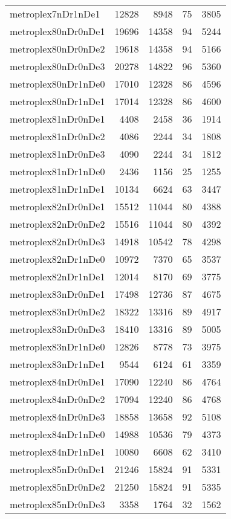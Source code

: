 \begin{longtable}{lrrrr}
metroplex7nDr1nDe1 & 12828 & 8948 & 75 & 3805 \\
metroplex80nDr0nDe1 & 19696 & 14358 & 94 & 5244 \\
metroplex80nDr0nDe2 & 19618 & 14358 & 94 & 5166 \\
metroplex80nDr0nDe3 & 20278 & 14822 & 96 & 5360 \\
metroplex80nDr1nDe0 & 17010 & 12328 & 86 & 4596 \\
metroplex80nDr1nDe1 & 17014 & 12328 & 86 & 4600 \\
metroplex81nDr0nDe1 & 4408 & 2458 & 36 & 1914 \\
metroplex81nDr0nDe2 & 4086 & 2244 & 34 & 1808 \\
metroplex81nDr0nDe3 & 4090 & 2244 & 34 & 1812 \\
metroplex81nDr1nDe0 & 2436 & 1156 & 25 & 1255 \\
metroplex81nDr1nDe1 & 10134 & 6624 & 63 & 3447 \\
metroplex82nDr0nDe1 & 15512 & 11044 & 80 & 4388 \\
metroplex82nDr0nDe2 & 15516 & 11044 & 80 & 4392 \\
metroplex82nDr0nDe3 & 14918 & 10542 & 78 & 4298 \\
metroplex82nDr1nDe0 & 10972 & 7370 & 65 & 3537 \\
metroplex82nDr1nDe1 & 12014 & 8170 & 69 & 3775 \\
metroplex83nDr0nDe1 & 17498 & 12736 & 87 & 4675 \\
metroplex83nDr0nDe2 & 18322 & 13316 & 89 & 4917 \\
metroplex83nDr0nDe3 & 18410 & 13316 & 89 & 5005 \\
metroplex83nDr1nDe0 & 12826 & 8778 & 73 & 3975 \\
metroplex83nDr1nDe1 & 9544 & 6124 & 61 & 3359 \\
metroplex84nDr0nDe1 & 17090 & 12240 & 86 & 4764 \\
metroplex84nDr0nDe2 & 17094 & 12240 & 86 & 4768 \\
metroplex84nDr0nDe3 & 18858 & 13658 & 92 & 5108 \\
metroplex84nDr1nDe0 & 14988 & 10536 & 79 & 4373 \\
metroplex84nDr1nDe1 & 10080 & 6608 & 62 & 3410 \\
metroplex85nDr0nDe1 & 21246 & 15824 & 91 & 5331 \\
metroplex85nDr0nDe2 & 21250 & 15824 & 91 & 5335 \\
metroplex85nDr0nDe3 & 3358 & 1764 & 32 & 1562 \\

\end{longtable}
